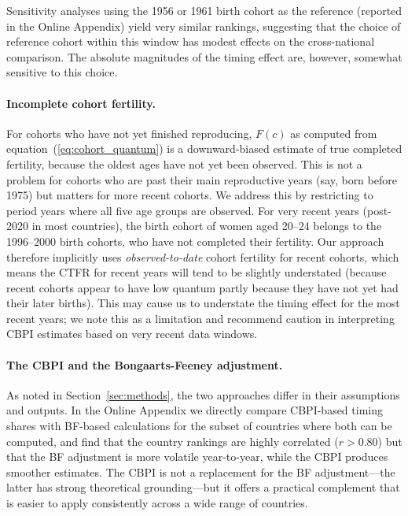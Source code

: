 \documentclass[12pt]{article}
\begin{document}
Sensitivity analyses using the 1956 or 1961 birth cohort as the
reference (reported in the Online Appendix) yield very similar
rankings, suggesting that the choice of reference cohort within this
window has modest effects on the cross-national comparison.  The
absolute magnitudes of the timing effect are, however, somewhat
sensitive to this choice.

\paragraph{Incomplete cohort fertility.}
For cohorts who have not yet finished reproducing, $F(c)$ as computed
from equation~(\ref{eq:cohort_quantum}) is a downward-biased estimate
of true completed fertility, because the oldest ages have not yet been
observed.  This is not a problem for cohorts who are past their main
reproductive years (say, born before 1975) but matters for more recent
cohorts.  We address this by restricting to period years where all
five age groups are observed.  For very recent years (post-2020 in
most countries), the birth cohort of women aged 20--24 belongs to the
1996--2000 birth cohorts, who have not completed their fertility.  Our
approach therefore implicitly uses \emph{observed-to-date} cohort
fertility for recent cohorts, which means the CTFR for recent years
will tend to be slightly understated (because recent cohorts appear to
have low quantum partly because they have not yet had their later
births).  This may cause us to understate the timing effect for the
most recent years; we note this as a limitation and recommend caution
in interpreting CBPI estimates based on very recent data windows.

\paragraph{The CBPI and the Bongaarts-Feeney adjustment.}
As noted in Section~\ref{sec:methods}, the two approaches differ in
their assumptions and outputs.  In the Online Appendix we directly
compare CBPI-based timing shares with BF-based calculations for the
subset of countries where both can be computed, and find that the
country rankings are highly correlated ($r > 0.80$) but that the BF
adjustment is more volatile year-to-year, while the CBPI produces
smoother estimates.  The CBPI is not a replacement for the BF
adjustment---the latter has strong theoretical grounding---but it
offers a practical complement that is easier to apply consistently
across a wide range of countries.
\end{document}
